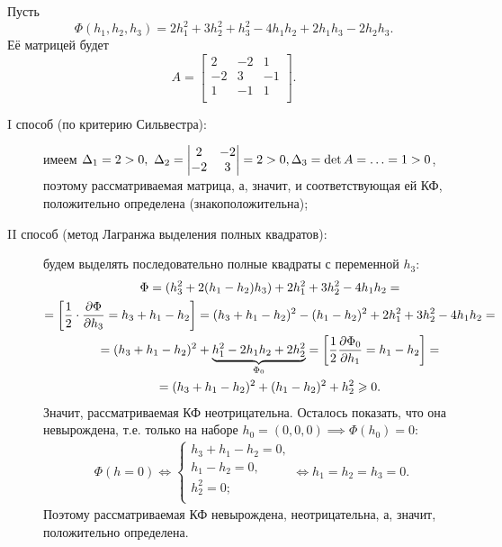 \documentclass[../../main.tex]{subfiles}
\begin{document}
	\begin{exmp}
		Пусть
		\[
			\Phi(h_1, h_2, h_3)
			= 2 h_1^2 + 3 h_2^2 + h_3^2 - 4 h_1 h_2 + 2 h_1 h_3 - 2 h_2 h_3.
		\]
		Её матрицей будет
		\[
			A =
			\begin{bmatrix}
				2 & -2 & 1 \\
				-2 & 3 & -1 \\
				1 & -1 & 1 \\
			\end{bmatrix}.
		\]
		\begin{description}
			\item[I способ (по критерию Сильвестра):]
			имеем $\Delta_1 = 2 > 0,\ \Delta_2 =
			\begin{vmatrix}
				2 & -2 \\
				-2 & 3 \\
			\end{vmatrix}
			= 2 > 0, \\
			\Delta_3 = \det A = \ldots = 1 > 0$,
			поэтому рассматриваемая матрица, а, значит, и соответствующая ей КФ,
			положительно определена (знакоположительна);
			
			\item[II способ (метод Лагранжа выделения полных квадратов):]
			будем выделять последовательно полные квадраты с переменной $h_3$:
			\begin{gather*}
				\Phi
				= (h_3^2 + 2(h_1 - h_2) h_3) + 2 h_1^2 + 3 h_2^2 - 4 h_1 h_2
				= \\ = \left[\dfrac{1}{2}\cdot \frac{\partial \Phi}{\partial h_3}
				= h_3 + h_1 - h_2\right]
				= (h_3 + h_1 - h_2)^2 - (h_1 - h_2)^2 + 2 h_1^2 + 3 h_2^2
				- 4 h_1 h_2
				= \\ = (h_3 + h_1 - h_2)^2 + \underbrace{h_1^2 - 2 h_1 h_2
				+ 2 h_2^2}_{\Phi_0}
				= \left[\dfrac{1}{2} \frac{\partial \Phi_0}{\partial h_1}
				= h_1 - h_2\right]
				= \\ = (h_3 + h_1 - h_2)^2 + (h_1 - h_2)^2 + h_2^2 \geqslant 0.
			\end{gather*}
			Значит, рассматриваемая КФ неотрицательна.
			Осталось показать, что она невырождена,
			т.е. только на наборе $h_0 = (0, 0, 0) \implies
			\Phi(h_0) = 0$:
			\begin{gather*}
				\Phi(h = 0)
				\iff
				\begin{cases}
					h_3 + h_1 - h_2 = 0, \\
					h_1 - h_2 = 0, \\
					h_2^2 = 0; \\
				\end{cases}
				\iff
				h_1 = h_2 = h_3 = 0.
			\end{gather*}
			Поэтому рассматриваемая КФ невырождена, неотрицательна,
			а, значит, положительно определена.
		\end{description}
	\end{exmp}
	
\end{document}
